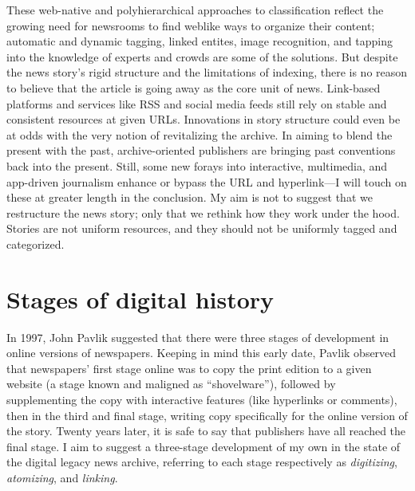 These web-native and polyhierarchical approaches to classification reflect the growing need for newsrooms to find weblike ways to organize their content; automatic and dynamic tagging, linked entites, image recognition, and tapping into the knowledge of experts and crowds are some of the solutions. But despite the news story's rigid structure and the limitations of indexing, there is no reason to believe that the article is going away as the core unit of news. Link-based platforms and services like RSS and social media feeds still rely on stable and consistent resources at given URLs. Innovations in story structure could even be at odds with the very notion of revitalizing the archive. In aiming to blend the present with the past, archive-oriented publishers are bringing past conventions back into the present. Still, some new forays into interactive, multimedia, and app-driven journalism enhance or bypass the URL and hyperlink---I will touch on these at greater length in the conclusion. My aim is not to suggest that we restructure the news story; only that we rethink how they work under the hood. Stories are not uniform resources, and they should not be uniformly tagged and categorized.

\section{Stages of digital history}


In 1997, John Pavlik suggested that there were three stages of development in online versions of newspapers. Keeping in mind this early date, Pavlik observed that newspapers' first stage online was to copy the print edition to a given website (a stage known and maligned as ``shovelware''), followed by supplementing the copy with interactive features (like hyperlinks or comments), then in the third and final stage, writing copy specifically for the online version of the story.\autocite{pavlik_future_1997} Twenty years later, it is safe to say that publishers have all reached the final stage. I aim to suggest a three-stage development of my own in the state of the digital legacy news archive, referring to each stage respectively as \emph{digitizing}, \emph{atomizing}, and \emph{linking}.

